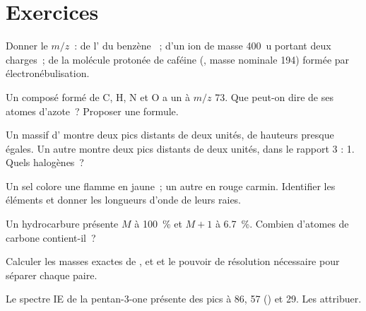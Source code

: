 \section{Exercices}

\begin{exercise}[$\star$]\label{exo:b2:mass-spec-atomic:1}
Donner le $m/z$~: de l' du benzène ~; d'un ion de masse \qty{400}{u} portant deux
charges~; de la molécule protonée de caféine (, masse nominale 194) formée par
électronébulisation.
\end{exercise}

\begin{exercise}[$\star$]\label{exo:b2:mass-spec-atomic:2}
Un composé formé de C, H, N et O a un  à $m/z$ 73. Que peut-on dire de ses atomes
d'azote~? Proposer une formule.
\end{exercise}

\begin{exercise}[$\star$]\label{exo:b2:mass-spec-atomic:3}
Un massif d' montre deux pics distants de deux unités, de hauteurs presque égales. Un autre
montre deux pics distants de deux unités, dans le rapport 3 : 1. Quels halogènes~?
\end{exercise}

\begin{exercise}[$\star$]\label{exo:b2:mass-spec-atomic:4}
Un sel colore une flamme en jaune~; un autre en rouge carmin. Identifier les éléments et donner les
longueurs d'onde de leurs raies.
\end{exercise}

\begin{exercise}[$\star\star$]\label{exo:b2:mass-spec-atomic:5}
Un hydrocarbure présente $M$ à 100~\% et $M+1$ à 6.7~\%. Combien d'atomes de carbone contient-il~?
\end{exercise}

\begin{exercise}[$\star\star$]\label{exo:b2:mass-spec-atomic:6}
Calculer les masses exactes de ,  et  et le pouvoir de résolution nécessaire pour
séparer chaque paire.
\end{exercise}

\begin{exercise}[$\star\star$]\label{exo:b2:mass-spec-atomic:7}
Le spectre IE de la pentan-3-one présente des pics à 86, 57 () et 29. Les attribuer.
\end{exercise}

